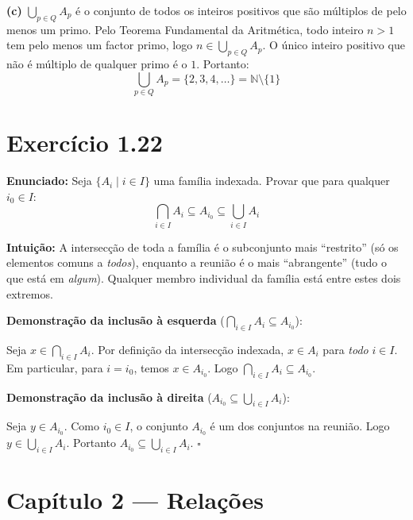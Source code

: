 \documentclass[12pt,a4paper]{article}
\begin{document}
\textbf{(c)} $\bigcup_{p \in Q} A_p$ é o conjunto de todos os inteiros positivos que são múltiplos de pelo menos um primo. Pelo Teorema Fundamental da Aritmética, todo inteiro $n > 1$ tem pelo menos um factor primo, logo $n \in \bigcup_{p \in Q} A_p$. O único inteiro positivo que não é múltiplo de qualquer primo é o $1$. Portanto:
\[
\bigcup_{p \in Q} A_p = \{2, 3, 4, \ldots\} = \mathbb{N} \setminus \{1\}
\]

\section*{Exercício 1.22}

\textbf{Enunciado:} Seja $\{A_i \mid i \in I\}$ uma família indexada. Provar que para qualquer $i_0 \in I$:
\[
\bigcap_{i \in I} A_i \subseteq A_{i_0} \subseteq \bigcup_{i \in I} A_i
\]

\begin{teoribox}
\textbf{Intuição:} A intersecção de toda a família é o subconjunto mais ``restrito'' (só os elementos comuns a \emph{todos}), enquanto a reunião é o mais ``abrangente'' (tudo o que está em \emph{algum}). Qualquer membro individual da família está entre estes dois extremos.
\end{teoribox}

\textbf{Demonstração da inclusão à esquerda} ($\bigcap_{i \in I} A_i \subseteq A_{i_0}$):

Seja $x \in \bigcap_{i \in I} A_i$. Por definição da intersecção indexada, $x \in A_i$ para \emph{todo} $i \in I$. Em particular, para $i = i_0$, temos $x \in A_{i_0}$. Logo $\bigcap_{i \in I} A_i \subseteq A_{i_0}$.

\textbf{Demonstração da inclusão à direita} ($A_{i_0} \subseteq \bigcup_{i \in I} A_i$):

Seja $y \in A_{i_0}$. Como $i_0 \in I$, o conjunto $A_{i_0}$ é um dos conjuntos na reunião. Logo $y \in \bigcup_{i \in I} A_i$. Portanto $A_{i_0} \subseteq \bigcup_{i \in I} A_i$. \hfill$\square$

\newpage

\section*{Capítulo 2 --- Relações}
\end{document}
